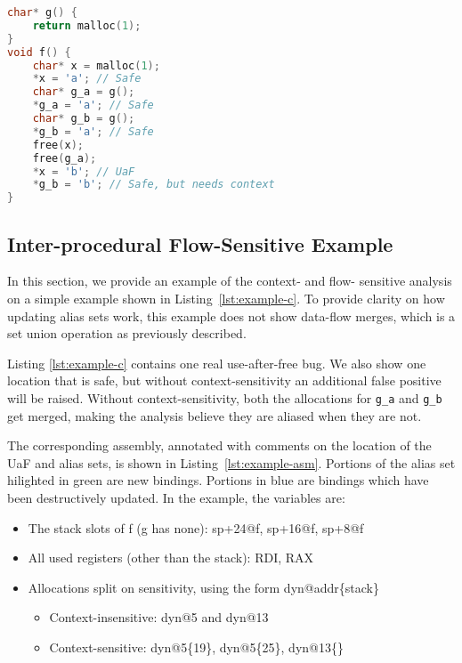 \begin{lstlisting}[language=C, float=t, caption={Example (C)}, label=lst:example-c]
char* g() {
	return malloc(1);
}
void f() {
	char* x = malloc(1);
	*x = 'a'; // Safe
	char* g_a = g();
	*g_a = 'a'; // Safe
	char* g_b = g();
	*g_b = 'a'; // Safe
	free(x);
	free(g_a);
	*x = 'b'; // UaF
	*g_b = 'b'; // Safe, but needs context
}
\end{lstlisting}

\subsection{Inter-procedural Flow-Sensitive Example}
In this section, we provide an example of the context- and flow-
sensitive analysis on a simple example shown in
Listing~\ref{lst:example-c}. To provide clarity on how updating alias
sets work, this example does not show data-flow merges, which is a set
union operation as previously described.

Listing \ref{lst:example-c} contains one real use-after-free bug.  We
also show one location that is safe, but without context-sensitivity
an additional false positive will be raised. Without
context-sensitivity, both the allocations for \texttt{g\_a} and
\texttt{g\_b} get merged, making the analysis believe they are aliased
when they are not.




The corresponding assembly, annotated with comments on the location of
the UaF and alias sets, is shown in Listing~\ref{lst:example-asm}.
Portions of the alias set hilighted in green are new bindings.
Portions in blue are bindings which have been destructively updated.
In the example, the variables are:
\begin{itemize}
	\item The stack slots of f (g has none): sp+24@f, sp+16@f, sp+8@f
	\item All used registers (other than the stack): RDI, RAX
	\item Allocations split on sensitivity, using the form dyn@addr\{stack\}
          \begin{itemize}
          \item Context-insensitive: dyn@5 and dyn@13
          \item Context-sensitive: dyn@5\{19\}, dyn@5\{25\}, dyn@13\{\}
          \end{itemize}
\end{itemize}

